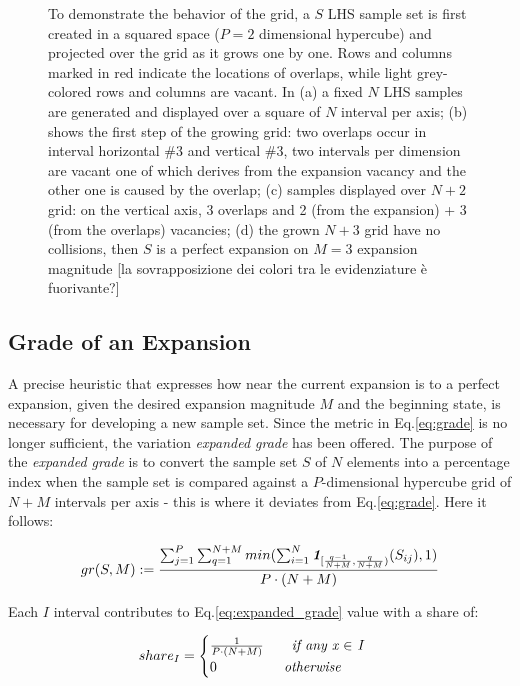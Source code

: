 \documentclass[12pt]{article}
\newcommand{\meqref}[1]{Eq.\ref{#1}}
\newcommand{\indfunc}[1]{\textit{\textbf{1}}_{#1}}
\begin{document}
\begin{figure}[]
    \caption{To demonstrate the behavior of the grid, a $S$ LHS sample set is first created in a squared space ($P = 2$ dimensional hypercube) and projected over the grid as it grows one by one. Rows and columns marked in red indicate the locations of overlaps, while light grey-colored rows and columns are vacant. In (a) a fixed $N$ LHS samples are generated and displayed over a square of $N$ interval per axis; (b) shows the first step of the growing grid: two overlaps occur in interval horizontal \#3 and vertical \#3, two intervals per dimension are vacant one of which derives from the expansion vacancy and the other one is caused by the overlap; (c) samples displayed over $N + 2$ grid: on the vertical axis, 3 overlaps and 2 (from the expansion) + 3 (from the overlaps) vacancies; (d) the grown $N + 3$ grid have no collisions, then $S$ is a perfect expansion on $M = 3$ expansion magnitude [la sovrapposizione dei colori tra le evidenziature è fuorivante?]}
    \label{fig:example_overlaps}
\end{figure}

\subsection{Grade of an Expansion}
\label{subsec:expansion_grade}
A precise heuristic that expresses how near the current expansion is to a perfect expansion, given the desired expansion magnitude $M$ and the beginning state, is necessary for developing a new sample set. Since the metric in \meqref{eq:grade} is no longer sufficient, the variation \textit{expanded grade} has been offered.
The purpose of the \textit{expanded grade} is to convert the sample set $S$ of $N$ elements into a percentage index when the sample set is compared against a $P$-dimensional hypercube grid of $N+M$ intervals per axis - this is where it deviates from \meqref{eq:grade}. Here it follows:

\begin{equation}
\label{eq:expanded_grade}
gr(S, M) := \frac{\sum^P_{j=1}\sum^{N + M}_{q=1} min(\sum^N_{i=1}\indfunc{[\frac{q-1}{N + M}, \frac{q}{N + M})}(S_{ij}), 1)}{P \cdot (N + M)}
\end{equation}

Each $I$ interval contributes to \meqref{eq:expanded_grade} value with a share of:

\begin{equation}
\label{eq:single_contribute_interval}
share_I = 
\begin{cases}
\frac{1}{P \cdot (N+M)} \qquad \text{\textit{if any x $\in$ I}}\\
0 \qquad\qquad\;\;\; \text{\textit{otherwise}}
\end{cases}
\end{equation}
\end{document}
